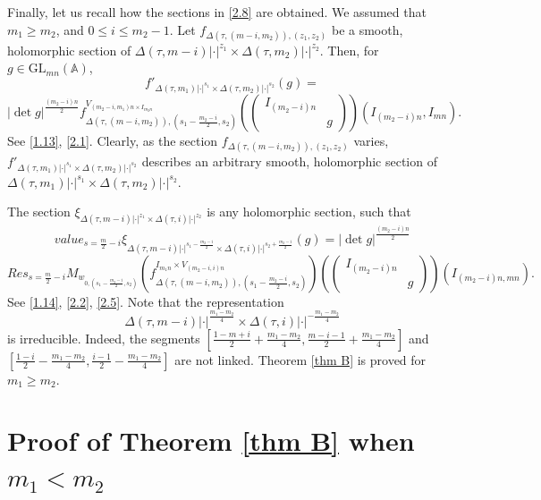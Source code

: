 \documentclass[12pts]{amsart}
\newcommand{\BA}{{\mathbb {A}}}
\newcommand{\GL}{{\mathrm{GL}}}
\begin{document}
 		Finally, let us recall how the sections in \eqref{2.8} are obtained. We assumed that $m_1\geq m_2$, and $0\leq i\leq m_2-1$. Let $f_{\Delta(\tau,(m-i,m_2)),(z_1,z_2)}$ be a smooth, holomorphic section of $\Delta(\tau,m-i)|\cdot|^{z_1}\times \Delta(\tau,m_2)|\cdot|^{z_2}$. Then, for $g\in \GL_{mn}(\BA)$, 
 		\begin{equation}\label{2.9}
 		f'_{\Delta(\tau,m_1)|\cdot|^{s_1}\times \Delta(\tau,m_2)|\cdot|^{s_2}}(g)=
 		\end{equation}
 		$$
 		|\det g|^{\frac{(m_2-i) n}{2}}f^{V_{(m_2-i,m_1)n\times I_{m_2n}}}_{\Delta(\tau,(m-i,m_2)),(s_1-\frac{m_2-i}{2},s_2)}(\begin{pmatrix}I_{(m_2-i)n}\\&g\end{pmatrix})(I_{(m_2-i)n},I_{mn}).
 		$$
 		See \eqref{1.13}, \eqref{2.1}. Clearly, as the section $f_{\Delta(\tau,(m-i,m_2)),(z_1,z_2)}$ varies,\\ $f'_{\Delta(\tau,m_1)|\cdot|^{s_1}\times \Delta(\tau,m_2)|\cdot|^{s_2}}$ describes an arbitrary smooth, holomorphic section of\\ $\Delta(\tau,m_1)|\cdot|^{s_1}\times \Delta(\tau,m_2)|\cdot|^{s_2}$. 
 		
 		The section $\xi_{\Delta(\tau,m-i)|\cdot|^{z_1}\times \Delta(\tau,i)|\cdot|^{z_2}}$ is any holomorphic section, such that
 		\begin{equation}\label{2.10}
 		value_{s=\frac{m}{2}-i}\xi_{\Delta(\tau,m-i)|\cdot|^{s_1-\frac{m_2-i}{2}}\times \Delta(\tau,i)|\cdot|^{s_2+\frac{m_2-i}{2}}}(g)=|\det g|^{\frac{(m_2-i) n}{2}}
 		\end{equation}
 		$$
 		Res_{s=\frac{m}{2}-i}M_{w_{0,(s_1-\frac{m_2-i}{2},s_2)}}(f^{I_{m_1n}\times V_{(m_2-i,i)n}}_{\Delta(\tau,(m-i,m_2)),(s_1-\frac{m_2-i}{2},s_2)})(\begin{pmatrix}I_{(m_2-i)n}\\&g\end{pmatrix})(I_{(m_2-i)n,mn}).
 		$$
 		See \eqref{1.14}, \eqref{2.2}, \eqref{2.5}. Note that the representation $$\Delta(\tau,m-i)|\cdot|^{\frac{m_1-m_2}{4}}\times \Delta(\tau,i)|\cdot|^{-\frac{m_1-m_2}{4}}$$ is irreducible. 
 		Indeed, the segments $[\frac{1-m+i}{2}+\frac{m_1-m_2}{4},\frac{m-i-1}{2}+\frac{m_1-m_2}{4}]$ and\\ $[\frac{1-i}{2}-\frac{m_1-m_2}{4},\frac{i-1}{2}-\frac{m_1-m_2}{4}]$ are not linked. Theorem \ref{thm B} is proved for $m_1\geq m_2$.
 			 
\section{Proof of Theorem \ref{thm B} when $m_1<m_2$}
	
\end{document}
